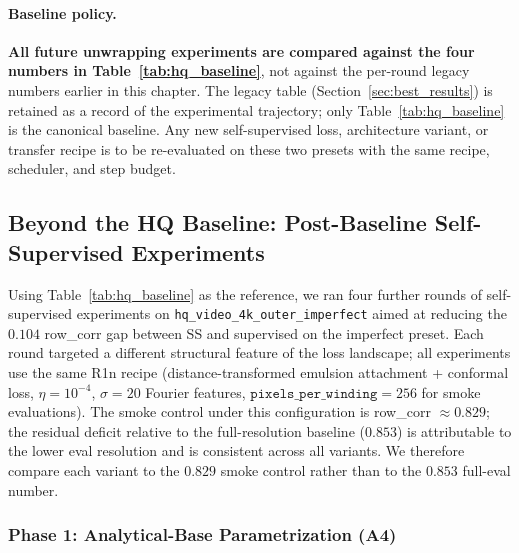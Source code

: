 \documentclass[11pt,a4paper]{article}
\begin{document}
\paragraph{Baseline policy.} \textbf{All future unwrapping experiments are compared against the four numbers in Table~\ref{tab:hq_baseline}}, not against the per-round legacy numbers earlier in this chapter. The legacy table (Section~\ref{sec:best_results}) is retained as a record of the experimental trajectory; only Table~\ref{tab:hq_baseline} is the canonical baseline. Any new self-supervised loss, architecture variant, or transfer recipe is to be re-evaluated on these two presets with the same recipe, scheduler, and step budget.

\subsection{Beyond the HQ Baseline: Post-Baseline Self-Supervised Experiments}
\label{sec:post_baseline}

Using Table~\ref{tab:hq_baseline} as the reference, we ran four further rounds of self-supervised experiments on \texttt{hq\_video\_4k\_outer\_imperfect} aimed at reducing the $0.104$ row\_corr gap between SS and supervised on the imperfect preset. Each round targeted a different structural feature of the loss landscape; all experiments use the same R1n recipe (distance-transformed emulsion attachment + conformal loss, $\eta = 10^{-4}$, $\sigma = 20$ Fourier features, $\texttt{pixels\_per\_winding} = 256$ for smoke evaluations). The smoke control under this configuration is row\_corr $\approx 0.829$; the residual deficit relative to the full-resolution baseline ($0.853$) is attributable to the lower eval resolution and is consistent across all variants. We therefore compare each variant to the $0.829$ smoke control rather than to the $0.853$ full-eval number.

\subsubsection{Phase 1: Analytical-Base Parametrization (A4)}
\label{sec:phase1_a4}
\end{document}
